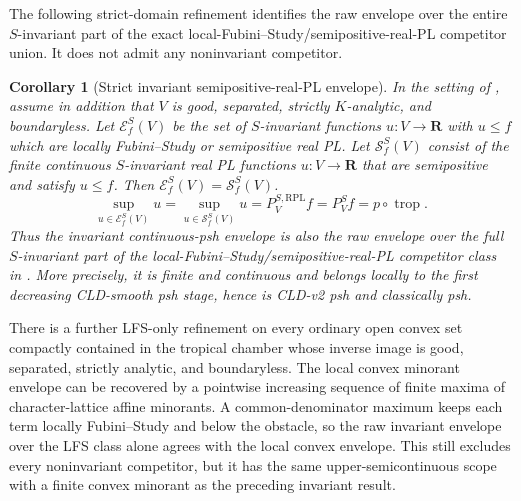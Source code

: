 \documentclass[11pt,a4paper]{article}
\newtheorem{corollary}[corollary]{Corollary}
\theoremstyle{definition}
\theoremstyle{remark}
\begin{document}
The following strict-domain refinement identifies the raw envelope over the
entire \(S\)-invariant part of the exact local-Fubini--Study/semipositive-real-PL
competitor union.  It does not admit any noninvariant competitor.

\begin{corollary}[Strict invariant semipositive-real-PL envelope]
\label{cor:p033-invariant-toric-semipositive-real-pl-envelope}
In the setting of
, assume in addition that
$V$ is good, separated, strictly \(K\)-analytic, and boundaryless.  Let
\(\mathcal E^S_f(V)\) be the set of \(S\)-invariant functions
\(u:V\to\mathbf R\) with \(u\leq f\) which are locally Fubini--Study or
semipositive real PL.  Let \(\mathcal S^S_f(V)\) consist of the finite
continuous \(S\)-invariant real PL functions \(u:V\to\mathbf R\) that are
semipositive and satisfy \(u\leq f\).  Then
\(\mathcal E^S_f(V)=\mathcal S^S_f(V)\).
\[
 \sup_{u\in\mathcal E^S_f(V)}u
 =\sup_{u\in\mathcal S^S_f(V)}u
 =P^{S,\mathrm{RPL}}_Vf=P^S_Vf=p\circ\operatorname{trop}.
\]
Thus the invariant continuous-psh envelope is also the raw envelope over
the full \(S\)-invariant part of the local-Fubini--Study/semipositive-real-PL
competitor class in .  More
precisely, it is finite and continuous and belongs locally to the first
decreasing CLD-smooth psh stage, hence is CLD-v2 psh and classically psh.
\end{corollary}




There is a further LFS-only refinement on every ordinary open convex set
compactly contained in the tropical chamber whose inverse image is good, separated,
strictly analytic, and boundaryless.  The local convex minorant envelope can
be recovered by a pointwise increasing sequence of finite maxima of
character-lattice affine minorants.  A common-denominator maximum keeps each
term locally Fubini--Study and below the obstacle, so the raw invariant
envelope over the LFS class alone agrees with the local convex envelope.
This still excludes every noninvariant
competitor, but it has the same upper-semicontinuous scope with a finite
convex minorant as the preceding invariant result.
\end{document}

